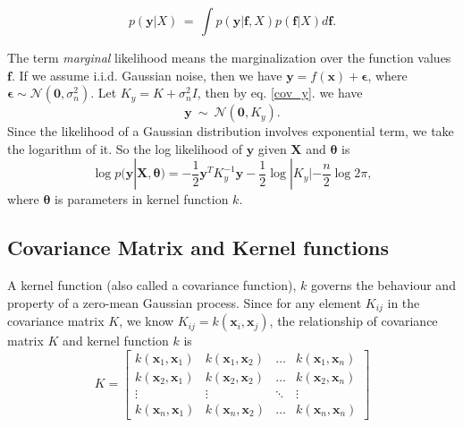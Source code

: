 \documentclass[11pt,a4paper]{article}
\theoremstyle{definition}
\numberwithin{equation}{section}
\let\vec\mathbf
\begin{document}
	\begin{equation}
	p(\vec y|X)\, = \, \int p(\vec y|\vec f, X)p(\vec f|X)d\vec f.
	\end{equation}
	
	The term \textit{marginal} likelihood means the marginalization over the function values $\vec f$. If we assume i.i.d. Gaussian noise, then we have $\vec y = f(\vec x) + \vec\epsilon$, where $\vec\epsilon \sim \mathcal{N}(\vec 0, \sigma^2_n)$. Let $K_y = K + \sigma^2_nI$, then by eq. \ref{cov_y}. we have
	\begin{equation}
	\vec y \  \sim \ \mathcal N \left(\vec 0,K_y  \right).
	\end{equation}
	Since the likelihood of a Gaussian distribution involves exponential term, we take the logarithm of it. So the log likelihood of $\vec y$ given $\vec X$ and $\vec \theta$ is
	\begin{equation}\label{log-likelihood}
	\log p(\vec y|\vec X, \vec \theta)=-\frac{1}{2}\vec y^T K_y^{-1}\vec y-\frac{1}{2}\log|K_y| - \frac{n}{2}\log 2\pi,
	\end{equation}
	where $\vec \theta$ is parameters in kernel function $k$.
	
	\subsection{Covariance Matrix and Kernel functions}\label{subsec:kernel_func}
	A kernel function (also called a covariance function), $k$ governs the behaviour and property of a zero-mean Gaussian process. Since for any element $K_{ij}$ in the covariance matrix $K$, we know $K_{ij} = k(\vec x_i,\vec x_j)$, the relationship of covariance matrix $K$ and kernel function $k$ is
	\begin{equation}\label{cov_mat}
	K = 
	\begin{bmatrix}
	k(\vec x_1,\vec x_1) & k(\vec x_1,\vec x_2)& \dots& k(\vec x_1,\vec x_n)\\
	k(\vec x_2,\vec x_1) & k(\vec x_2,\vec x_2)& \dots& k(\vec x_2,\vec x_n)\\
	\vdots & \vdots  & \ddots & \vdots \\
	k(\vec x_n,\vec x_1) & k(\vec x_n,\vec x_2)& \dots& k(\vec x_n,\vec x_n)
	\end{bmatrix}
	\end{equation}
	
	
\end{document}
